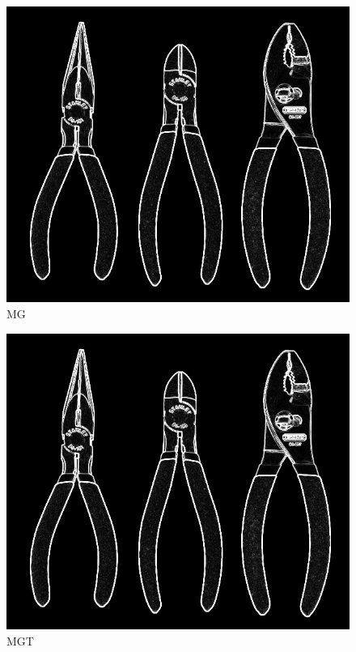 \documentclass[letterpaper]{article}
\theoremstyle{definition}
\theoremstyle{lemathm}
\theoremstyle{lemathm}
\theoremstyle{lemathm}
\theoremstyle{lemademthm}
\newcommand{\1}{\mathbbm{1}}
\begin{document}
	\begin{multicols}{2}
		\begin{figure}[H]
			\caption{MG}
			\begin{center}
				\includegraphics[scale = 0.3]{../images/MG.png}
			\end{center}
		\end{figure}
		\begin{figure}[H]
			\caption{MGT}
			\begin{center}
				\includegraphics[scale = 0.3]{../images/MG.png}
			\end{center}
		\end{figure}
	\end{multicols}
\end{document}
